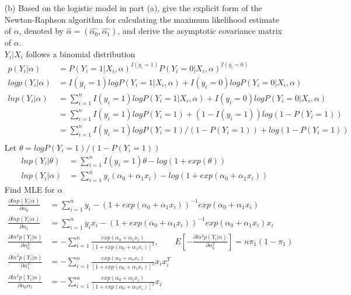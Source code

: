 \documentclass[11pt]{article} %
\begin{document}
\begin{itemize}
	\item[(b)] Based on the logistic model in part (a), give the explicit form of the Newton-Raphson
	algorithm for calculating the maximum likelihood estimate of $\alpha$, denoted by $\hat{\alpha} =
	(\hat{\alpha_0}, \hat{\alpha_1})$, and derive the asymptotic covariance matrix of $\alpha$.\\
	$Y_i|X_i$ follows a binomial distribution
	\begin{align*}
		p(Y_i|\alpha) &= P(Y_i=1 |X_i,\alpha)^{I(y_i=1)} P(Y_i=0 |X_i,\alpha)^{I(y_i=0)}\\
		log p(Y_i|\alpha) &= I(y_i=1) log P(Y_i=1 |X_i,\alpha) + I(y_i=0) log P(Y_i=0 |X_i,\alpha)\\
		ln p(Y_i|\alpha) &= \sum_{i=1}^n I(y_i=1) log P(Y_i=1 |X_i,\alpha) + I(y_i=0) log P(Y_i=0 |X_i,\alpha)\\
		&= \sum_{i=1}^n I(y_i=1) log P(Y_i=1) + (1-I(y_i=1)) log (1-P(Y_i=1)) \\
		&= \sum_{i=1}^n I(y_i=1) log P(Y_i=1)/(1-P(Y_i=1)) + log (1-P(Y_i=1))\\
	\end{align*}
	Let $\theta = log P(Y_i=1)/(1-P(Y_i=1))$
	\begin{align*}
		ln p(Y_i|\theta) &= \sum_{i=1}^n I(y_i=1) \theta - log (1 + exp(\theta) )\\
		ln p(Y_i|\alpha) &= \sum_{i=1}^n y_i (\alpha_0 + \alpha_1 x_i) - log \left(1 + exp(\alpha_0 + \alpha_1 x_i) \right)
	\end{align*}    
	Find MLE for $\alpha$
	\begin{align*}
		\frac{\partial ln p(Y_i|\alpha)}{\partial \alpha_0}  &= \sum_{i=1}^n y_i - \left(1 + exp(\alpha_0 + \alpha_1 x_i) \right)^{-1} exp(\alpha_0 + \alpha_1 x_i)\\
		\frac{\partial ln p(Y_i|\alpha)}{\partial \alpha_1}  &= \sum_{i=1}^n y_i x_i- \left(1 + exp(\alpha_0 + \alpha_1 x_i) \right)^{-1} exp(\alpha_0 + \alpha_1 x_i) x_i\\
		\frac{\partial ln^2 p(Y_i|\alpha)}{\partial \alpha_0^2}  &=- \sum_{i=1}^n \frac{exp(\alpha_0 + \alpha_1 x_i)}{[1+ exp(\alpha_0 + \alpha_1 x_i)]^2}, \qquad E[-\frac{\partial ln^2 p(Y_i|\alpha)}{\partial \alpha_0^2}] = n \pi_1 (1-\pi_1) \\
		\frac{\partial ln^2 p(Y_i|\alpha)}{\partial \alpha_1^2}  &=- \sum_{i=1}^n \frac{exp(\alpha_0 + \alpha_1 x_i)}{[1+ exp(\alpha_0 + \alpha_1 x_i)]^2} x_ix_i^T \\
		\frac{\partial ln^2 p(Y_i|\alpha)}{\partial \alpha_0\alpha_1}  &=- \sum_{i=1}^n \frac{exp(\alpha_0 + \alpha_1 x_i)}{[1+ exp(\alpha_0 + \alpha_1 x_i)]^2} x_i\\

\end{align*}
\end{itemize}
\end{document}
